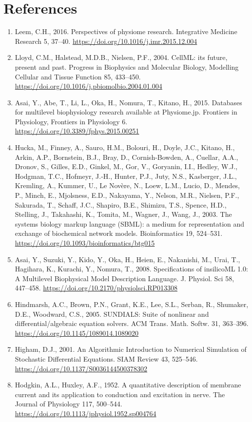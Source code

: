 \documentclass[a4paper,10pt]{report}
\begin{document}
\chapter{References}
\label{sec:orgf165ee5}

\begin{enumerate}
\item \label{orgd85b6f0} Leem, C.H., 2016. Perspectives of physiome research. Integrative Medicine Research 5, 37–40. \url{https://doi.org/10.1016/j.imr.2015.12.004}
\item \label{org959765b} Lloyd, C.M., Halstead, M.D.B., Nielsen, P.F., 2004. CellML: its future, present and past. Progress in Biophysics and Molecular Biology, Modelling Cellular and Tissue Function 85, 433–450. \url{https://doi.org/10.1016/j.pbiomolbio.2004.01.004}
\item \label{orgcb48ad3} Asai, Y., Abe, T., Li, L., Oka, H., Nomura, T., Kitano, H., 2015. Databases for multilevel biophysiology research available at Physiome.jp. Frontiers in Physiology, Frontiers in Physiology 6. \url{https://doi.org/10.3389/fphys.2015.00251}
\item \label{orgae38ec3} Hucka, M., Finney, A., Sauro, H.M., Bolouri, H., Doyle, J.C., Kitano, H., Arkin, A.P., Bornstein, B.J., Bray, D., Cornish-Bowden, A., Cuellar, A.A., Dronov, S., Gilles, E.D., Ginkel, M., Gor, V., Goryanin, I.I., Hedley, W.J., Hodgman, T.C., Hofmeyr, J.-H., Hunter, P.J., Juty, N.S., Kasberger, J.L., Kremling, A., Kummer, U., Le Novère, N., Loew, L.M., Lucio, D., Mendes, P., Minch, E., Mjolsness, E.D., Nakayama, Y., Nelson, M.R., Nielsen, P.F., Sakurada, T., Schaff, J.C., Shapiro, B.E., Shimizu, T.S., Spence, H.D., Stelling, J., Takahashi, K., Tomita, M., Wagner, J., Wang, J., 2003. The systems biology markup language (SBML): a medium for representation and exchange of biochemical network models. Bioinformatics 19, 524–531. \url{https://doi.org/10.1093/bioinformatics/btg015}
\item \label{org5a22982} Asai, Y., Suzuki, Y., Kido, Y., Oka, H., Heien, E., Nakanishi, M., Urai, T., Hagihara, K., Kurachi, Y., Nomura, T., 2008. Specifications of insilicoML 1.0: A Multilevel Biophysical Model Description Language. J. Physiol. Sci 58, 447–458. \url{https://doi.org/10.2170/physiolsci.RP013308}
\item \label{org0dc383e} Hindmarsh, A.C., Brown, P.N., Grant, K.E., Lee, S.L., Serban, R., Shumaker, D.E., Woodward, C.S., 2005. SUNDIALS: Suite of nonlinear and differential/algebraic equation solvers. ACM Trans. Math. Softw. 31, 363–396. \url{https://doi.org/10.1145/1089014.1089020}
\item \label{orgda52cce} Higham, D.J., 2001. An Algorithmic Introduction to Numerical Simulation of Stochastic Differential Equations. SIAM Review 43, 525–546. \url{https://doi.org/10.1137/S0036144500378302}
\item \label{orgc865066} Hodgkin, A.L., Huxley, A.F., 1952. A quantitative description of membrane current and its application to conduction and excitation in nerve. The Journal of Physiology 117, 500–544. \url{https://doi.org/10.1113/jphysiol.1952.sp004764}
\end{enumerate}
\end{document}

